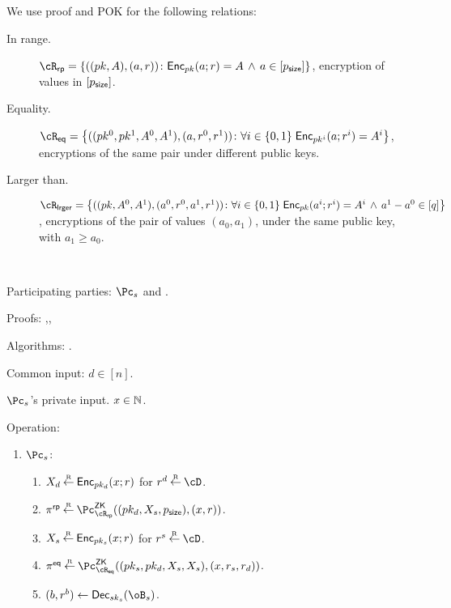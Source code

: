 We use proof and POK  for the   following  relations:

\begin{description}
	\item[In range.] $\rRP =\rRPDef$, \ie  encryption of values in $[p_{\mathsf{size}}]$.
	
	\item[Equality.] $\rEQ =\rEQDef$, \ie  encryptions of the same pair under different public keys.
	
	\item[Larger than.] $\rLrg =\rLrgDef$, \ie encryptions of the  pair of values $(a_0,a_1)$, under the same public key, with $a_1 \ge a_0$.
\end{description}




\begin{protocol}~\label{prot:ConfidentialTransactions:Transfer}
	\item[Participating parties:] $\Pc_s$ and \Cc.
	
\item[Proofs:]   \piZK{\rRP},\pZK{\rEQ},\pZK{\rLrg}


\item[Algorithms:]    \Dec.

	
	\item[Common input:] $d\in [n]$.
	
	\item[$\Pc_s$'s private  input.] $x \in {\mathbb{N}}$.
	
\item[Operation:] ~
	
	\begin{enumerate}
		\item  $\Pc_s$: 
		
		\begin{enumerate}
			\item $X_d \mathbin{\stackrel{\mbox{\tiny R}}{\leftarrow}} \mathsf{Enc}_{pk_d}(x;r)$ for $r^d \getsr \cD$.
			
		
			\item $\pi^\RPs \getsr \pZK{\rRP}((pk_d,X_s,\psize),(x,r))$.
			
			
			\item $X_s \mathbin{\stackrel{\mbox{\tiny R}}{\leftarrow}} \mathsf{Enc}_{pk_s}(x;r)$ for $r^s \getsr \cD$.
			
			
			
			\item $\pi^\Eqs \getsr \pZK{\rEQ}((pk_s,pk_d,X_s,X_s),(x,r_s,r_d))$.
			
			
			\item $(b,r^b) \asn \Dec_{sk_s}(\oB_s)$.
			

\end{enumerate}
\end{enumerate}
\end{protocol}
